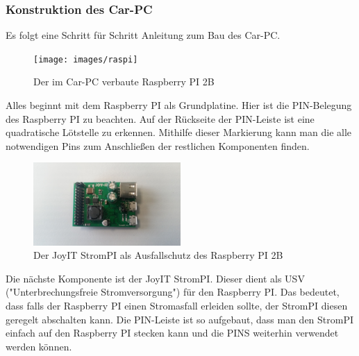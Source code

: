 \subsubsection{Konstruktion des Car-PC}
Es folgt eine Schritt für Schritt Anleitung zum Bau des Car-PC.

\begin{figure}[!htb]\centering
	\texttt{[image: images/raspi]}
	\caption{Der im Car-PC verbaute Raspberry PI 2B}\label{Fig:raspi}
\end{figure}
Alles beginnt mit dem Raspberry PI als Grundplatine. Hier ist die PIN-Belegung des Raspberry PI zu beachten. Auf der Rückseite der PIN-Leiste ist eine quadratische Lötstelle zu erkennen. Mithilfe dieser Markierung kann man die alle notwendigen Pins zum Anschließen der restlichen Komponenten finden.

\begin{figure}[!htb]\centering
	\includegraphics[width=0.5\textwidth]{images/strompi}
	\caption{Der JoyIT StromPI als Ausfallschutz des Raspberry PI 2B}\label{Fig:strompi}
\end{figure}
Die nächste Komponente ist der JoyIT StromPI. Dieser dient als USV ("Unterbrechungsfreie Stromversorgung") für den Raspberry PI. Das bedeutet, dass falls der Raspberry PI einen Stromasfall erleiden sollte, der StromPI diesen geregelt abschalten kann.
Die PIN-Leiste ist so aufgebaut, dass man den StromPI einfach auf den Raspberry PI stecken kann und die PINS weiterhin verwendet werden können.

